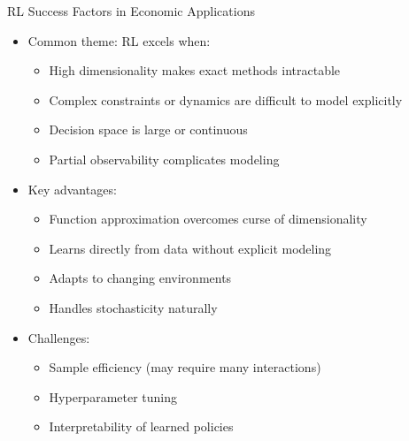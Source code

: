 \documentclass[10pt]{beamer}
\begin{document}
\begin{frame}{RL Success Factors in Economic Applications}
    \begin{itemize}
        \item Common theme: RL excels when:
        \begin{itemize}
            \item High dimensionality makes exact methods intractable
            \item Complex constraints or dynamics are difficult to model explicitly
            \item Decision space is large or continuous
            \item Partial observability complicates modeling
        \end{itemize}
        \vspace{0.2cm}
        \item Key advantages:
        \begin{itemize}
            \item Function approximation overcomes curse of dimensionality
            \item Learns directly from data without explicit modeling
            \item Adapts to changing environments
            \item Handles stochasticity naturally
        \end{itemize}
        \vspace{0.2cm}
        \item Challenges:
        \begin{itemize}
            \item Sample efficiency (may require many interactions)
            \item Hyperparameter tuning
            \item Interpretability of learned policies
        \end{itemize}
    \end{itemize}
\end{frame}

\end{document}
